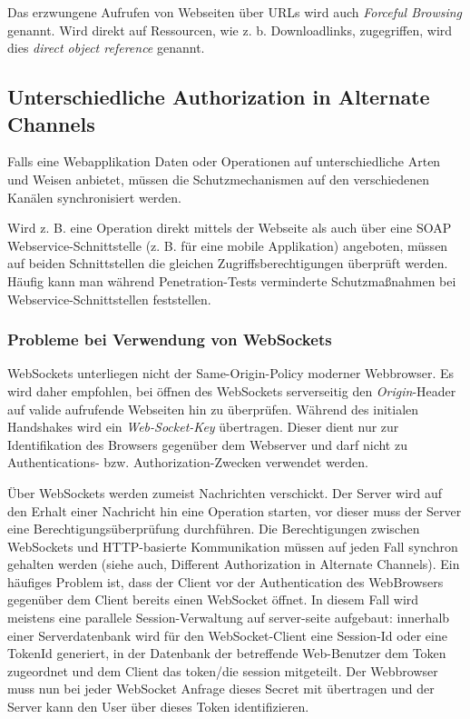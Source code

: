 Das erzwungene Aufrufen von Webseiten über URLs wird auch \textit{Forceful Browsing} genannt. Wird direkt auf Ressourcen, wie z. b. Downloadlinks, zugegriffen, wird dies \textit{direct object reference} genannt.

\subsection{Unterschiedliche Authorization in Alternate Channels}

Falls eine Webapplikation Daten oder Operationen auf unterschiedliche Arten und Weisen anbietet, müssen die Schutzmechanismen auf den verschiedenen Kanälen synchronisiert werden.

Wird z. B. eine Operation direkt mittels der Webseite als auch über eine SOAP Webservice-Schnittstelle (z. B. für eine mobile Applikation) angeboten, müssen auf beiden Schnittstellen die gleichen Zugriffsberechtigungen überprüft werden. Häufig kann man während Penetration-Tests verminderte Schutzmaßnahmen bei Webservice-Schnittstellen feststellen.

\subsubsection{Probleme bei Verwendung von WebSockets} 

WebSockets unterliegen nicht der Same-Origin-Policy moderner Webbrowser. Es wird daher empfohlen, bei öffnen des WebSockets serverseitig den \textit{Origin}-Header auf valide aufrufende Webseiten hin zu überprüfen. Während des initialen Handshakes wird ein \textit{Web-Socket-Key} übertragen. Dieser dient nur zur Identifikation des Browsers gegenüber dem Webserver und darf nicht zu Authentications- bzw. Authorization-Zwecken verwendet werden.

Über WebSockets werden zumeist Nachrichten verschickt. Der Server wird auf den Erhalt einer Nachricht hin eine Operation starten, vor dieser muss der Server eine Berechtigungsüberprüfung durchführen. Die Berechtigungen zwischen WebSockets und HTTP-basierte Kommunikation müssen auf jeden Fall synchron gehalten werden (siehe auch, Different Authorization in Alternate Channels).  
Ein häufiges Problem ist, dass der Client vor der Authentication des WebBrowsers gegenüber dem Client bereits einen WebSocket öffnet. In diesem Fall wird meistens eine parallele Session-Verwaltung auf server-seite aufgebaut: innerhalb einer Serverdatenbank wird für den WebSocket-Client eine Session-Id oder eine TokenId generiert, in der Datenbank der betreffende Web-Benutzer dem Token zugeordnet und dem Client das token/die session mitgeteilt. Der Webbrowser muss nun bei jeder WebSocket Anfrage dieses Secret mit übertragen und der Server kann den User über dieses Token identifizieren.

